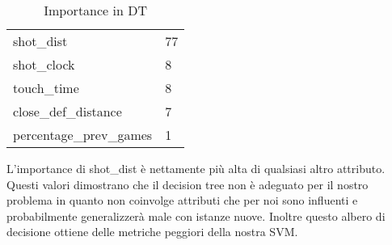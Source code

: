 \begin{table}[h!]
\centering
  \begin{tabular}{l l} 
shot\_dist &77\\
shot\_clock &8\\
touch\_time &8\\
close\_def\_distance &7\\
percentage\_prev\_games &1\\
    \end{tabular}
    \caption{Importance in DT}
\end{table}

L'importance di shot\_dist è nettamente più alta di qualsiasi altro attributo.
Questi valori dimostrano che il decision tree non è adeguato per il nostro problema in quanto non coinvolge attributi che per noi sono influenti e probabilmente generalizzerà male con istanze nuove.
Inoltre questo albero di decisione ottiene delle metriche peggiori della nostra SVM.
